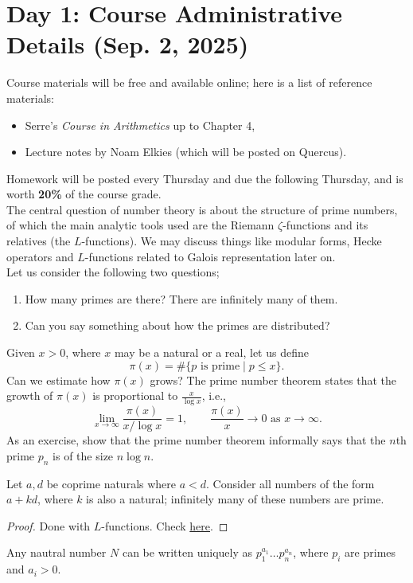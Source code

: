 \section{Day 1: Course Administrative Details (Sep. 2, 2025)}
Course materials will be free and available online; here is a list of reference materials:
\begin{itemize}
    \item Serre's \textit{Course in Arithmetics} up to Chapter 4,
    \item Lecture notes by Noam Elkies (which will be posted on Quercus).
\end{itemize}
Homework will be posted every Thursday and due the following Thursday, and is worth \textbf{20\%} of the course grade.
\\[8pt]
The central question of number theory is about the structure of prime numbers, of which the main analytic tools used are the Riemann $\zeta$-functions and its relatives (the $L$-functions). We may discuss things like modular forms, Hecke operators and $L$-functions related to Galois representation later on.
\\[8pt]
Let us consider the following two questions;
\begin{enumerate}[label=(\alph*)]
    \item How many primes are there? There are infinitely many of them.
    \item Can you say something about how the primes are distributed?
\end{enumerate}
Given $x > 0$, where $x$ may be a natural or a real, let us define
\[ \pi(x) = \#\{p \text{ is prime} \mid p \leq x\}. \]
Can we estimate how $\pi(x)$ grows? The prime number theorem states that the growth of $\pi(x)$ is proportional to $\frac{x}{\log x}$, i.e.,
\[ \lim_{x \to \infty} \frac{\pi(x)}{x / \log x} = 1, \qquad \frac{\pi(x)}{x} \to 0 \text{ as } x \to \infty. \]
As an exercise, show that the prime number theorem informally says that the $n$th prime $p_n$ is of the size $n \log n$.
\begin{simplethm}
    Let $a, d$ be coprime naturals where $a < d$. Consider all numbers of the form $a + kd$, where $k$ is also a natural; infinitely many of these numbers are prime.
\end{simplethm}
\begin{proof}
    Done with $L$-functions. Check \href{https://math.stackexchange.com/a/4711381}{here}.
\end{proof}
\begin{simplethm}
    Any nautral number $N$ can be written uniquely as $p_1^{a_1} \dots p_n^{a_n}$, where $p_i$ are primes and $a_i > 0$.
\end{simplethm}
